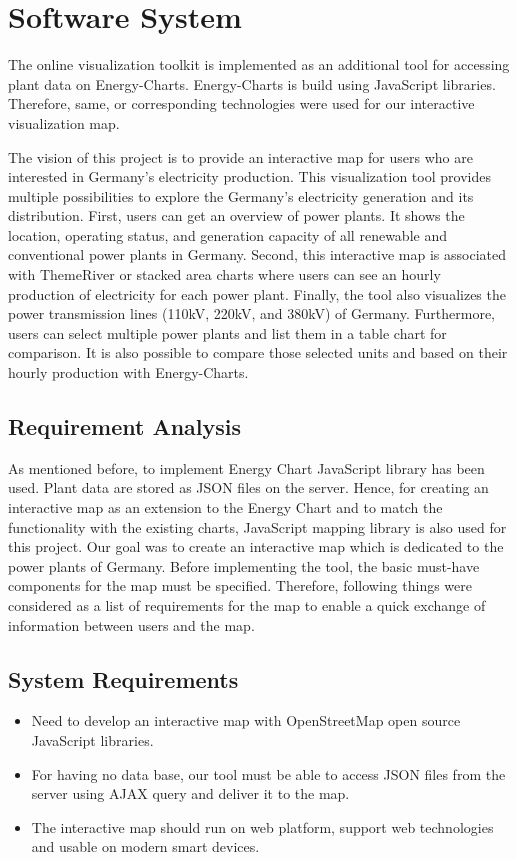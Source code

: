 \chapter{Software System}
\label{chap:softwareSystem}

The online visualization toolkit is implemented as an additional tool for accessing plant data on Energy-Charts. Energy-Charts is build using JavaScript libraries. Therefore, same, or corresponding technologies were used for our interactive visualization map. 

The vision of this project is to provide an interactive map for users who are interested in Germany’s electricity production.  This visualization tool provides multiple possibilities to explore the Germany’s electricity generation and its distribution. First, users can get an overview of power plants. It shows the location, operating status, and generation capacity of all renewable and conventional power plants in Germany. Second, this interactive map is associated with ThemeRiver or stacked area charts where users can see an hourly production of electricity for each power plant. Finally, the tool also visualizes the power transmission lines (110kV, 220kV, and 380kV) of Germany. Furthermore, users can select multiple power plants and list them in a table chart for comparison. It is also possible to compare those selected units and based on their hourly production with Energy-Charts. 

\section{Requirement Analysis}
\label{sec:reqAn}

As mentioned before, to implement Energy Chart JavaScript library has been used. Plant data are stored as JSON files on the server. Hence, for creating an interactive map as an extension to the Energy Chart and to match the functionality with the existing charts, JavaScript mapping library is also used for this project. Our goal was to create an interactive map which is dedicated to the power plants of Germany. Before implementing the tool, the basic must-have components for the map must be specified. Therefore, following things were considered as a list of requirements for the map to enable a quick exchange of information between users and the map.

\section*{System Requirements}
\begin{itemize}
	\item{Need to develop an interactive map with OpenStreetMap open source JavaScript libraries.}
	\item{For having no data base, our tool must be able to access JSON files from the server using AJAX query and deliver it to the map.}
	\item{The interactive map should run on web platform, support web technologies and usable on modern smart devices.}
\end{itemize}

